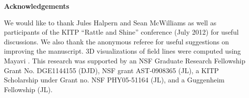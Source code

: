 \bigskip

{\bf{Acknowledgements}}

\medskip

We would like to thank Jules Halpern and Sean McWilliams as well as participants
of the KITP ``Rattle and Shine'' conference (July 2012) for useful discussions. We also 
thank the anonymous referee for useful suggestions on improving the manuscript.
3D visualizations of field lines were computed using Mayavi \citep{mayavi}.
This research was supported by an NSF Graduate Research Fellowship Grant No. DGE1144155
(DJD), NSF grant AST-0908365 (JL), 
a KITP Scholarship under Grant no. NSF PHY05-51164 (JL), and a Guggenheim
Fellowship (JL).

\clearpage





%
